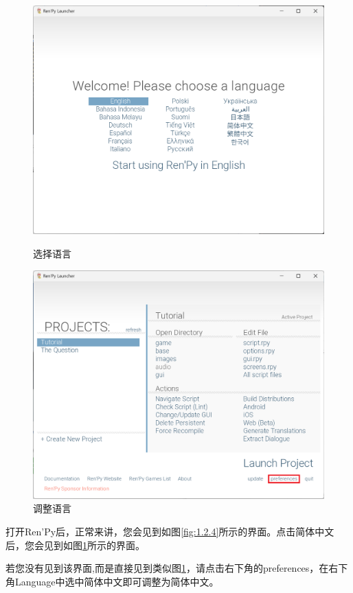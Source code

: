 \documentclass[../../Main.tex]{subfiles}
\begin{document}
\begin{figure}[htbp]
    \centering
    \begin{minipage}{182pt}
        \centering
        \includegraphics[scale=.2]{1.2.4.png}
        \caption{选择语言}
        \label{fig:1.2.4}
    \end{minipage}
    \hspace{10pt}
    \begin{minipage}{182pt}
        \centering
        \includegraphics[scale=.2]{1.2.5.png}
        \caption{调整语言}
        \label{fig:1.2.5}
    \end{minipage}
\end{figure}

打开Ren'Py后，正常来讲，您会见到如图\ref{fig:1.2.4}所示的界面。点击简体中文后，您会见到如图\ref{fig:1.2.5}所示的界面。

若您没有见到该界面,而是直接见到类似图\ref{fig:1.2.5}，请点击右下角的preferences，在右下角Language中选中简体中文即可调整为简体中文。
\end{document}
